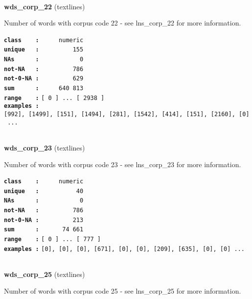 \documentclass[]{article}
\begin{document}
~

\textbf{wds\_corp\_22} (textlines)

Number of words with corpus code 22 - see lns\_corp\_22 for more
information.

\textbf{\texttt{class\ \ \ \ :}} \texttt{~~~~~numeric}\\
\textbf{\texttt{unique\ \ \ :}} \texttt{~~~~~~~~~155}\\
\textbf{\texttt{NAs\ \ \ \ \ \ :}} \texttt{~~~~~~~~~~~0}\\
\textbf{\texttt{not-NA\ \ \ :}} \texttt{~~~~~~~~~786}\\
\textbf{\texttt{not-0-NA\ :}} \texttt{~~~~~~~~~629}\\
\textbf{\texttt{sum\ \ \ \ \ \ :}} \texttt{~~~~~640~813}\\
\textbf{\texttt{range\ \ \ \ :}}
\texttt{{[}\ 0\ {]}\ ...\ {[}\ 2938\ {]}}\\
\textbf{\texttt{examples\ :}}
\texttt{{[}992{]},\ {[}1499{]},\ {[}151{]},\ {[}1494{]},\ {[}281{]},\ {[}1542{]},\ {[}414{]},\ {[}151{]},\ {[}2160{]},\ {[}0{]}\ ...}\\

~

\textbf{wds\_corp\_23} (textlines)

Number of words with corpus code 23 - see lns\_corp\_23 for more
information.

\textbf{\texttt{class\ \ \ \ :}} \texttt{~~~~~numeric}\\
\textbf{\texttt{unique\ \ \ :}} \texttt{~~~~~~~~~~40}\\
\textbf{\texttt{NAs\ \ \ \ \ \ :}} \texttt{~~~~~~~~~~~0}\\
\textbf{\texttt{not-NA\ \ \ :}} \texttt{~~~~~~~~~786}\\
\textbf{\texttt{not-0-NA\ :}} \texttt{~~~~~~~~~213}\\
\textbf{\texttt{sum\ \ \ \ \ \ :}} \texttt{~~~~~~74~661}\\
\textbf{\texttt{range\ \ \ \ :}}
\texttt{{[}\ 0\ {]}\ ...\ {[}\ 777\ {]}}\\
\textbf{\texttt{examples\ :}}
\texttt{{[}0{]},\ {[}0{]},\ {[}0{]},\ {[}671{]},\ {[}0{]},\ {[}0{]},\ {[}209{]},\ {[}635{]},\ {[}0{]},\ {[}0{]}\ ...}\\

~

\textbf{wds\_corp\_25} (textlines)

Number of words with corpus code 25 - see lns\_corp\_25 for more
information.
\end{document}
